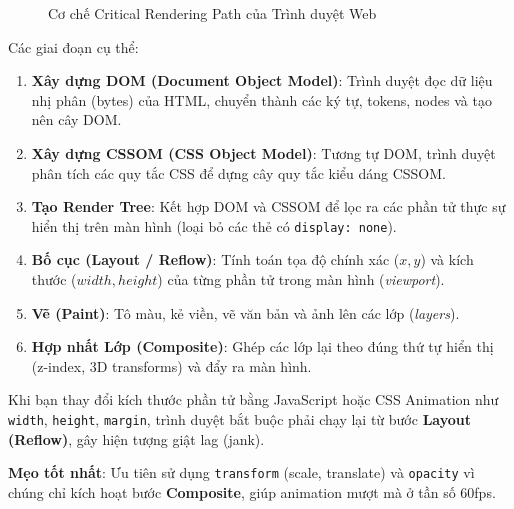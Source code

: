 \documentclass[11pt,oneside]{book}
\newcommand{\codeinline}[1]{\textcolor{accentOrange}{\texttt{#1}}}
\begin{document}
\begin{figure}[H]
\begin{tcolorbox}
{%
    }
    \end{tcolorbox}
    \vspace{-2pt}
    \caption{Cơ chế Critical Rendering Path của Trình duyệt Web}
    \label{fig:crp_process}
\end{figure}

Các giai đoạn cụ thể:
\begin{enumerate}
    \item \textbf{Xây dựng DOM (Document Object Model)}: Trình duyệt đọc dữ liệu nhị phân (bytes) của HTML, chuyển thành các ký tự, tokens, nodes và tạo nên cây DOM.
    \item \textbf{Xây dựng CSSOM (CSS Object Model)}: Tương tự DOM, trình duyệt phân tích các quy tắc CSS để dựng cây quy tắc kiểu dáng CSSOM.
    \item \textbf{Tạo Render Tree}: Kết hợp DOM và CSSOM để lọc ra các phần tử thực sự hiển thị trên màn hình (loại bỏ các thẻ có \texttt{display: none}).
    \item \textbf{Bố cục (Layout / Reflow)}: Tính toán tọa độ chính xác ($x, y$) và kích thước ($width, height$) của từng phần tử trong màn hình (\textit{viewport}).
    \item \textbf{Vẽ (Paint)}: Tô màu, kẻ viền, vẽ văn bản và ảnh lên các lớp (\textit{layers}).
    \item \textbf{Hợp nhất Lớp (Composite)}: Ghép các lớp lại theo đúng thứ tự hiển thị (z-index, 3D transforms) và đẩy ra màn hình.
\end{enumerate}

\begin{warnBox}
Khi bạn thay đổi kích thước phần tử bằng JavaScript hoặc CSS Animation như \codeinline{width}, \codeinline{height}, \codeinline{margin}, trình duyệt bắt buộc phải chạy lại từ bước \textbf{Layout (Reflow)}, gây hiện tượng giật lag (jank). 

\textbf{Mẹo tốt nhất}: Ưu tiên sử dụng \codeinline{transform} (scale, translate) và \codeinline{opacity} vì chúng chỉ kích hoạt bước \textbf{Composite}, giúp animation mượt mà ở tần số 60fps.
\end{warnBox}
\end{document}
